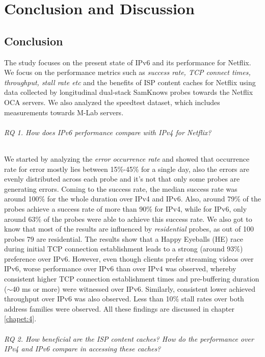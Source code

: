 \chapter{Conclusion and Discussion}\label{chapter:8}

\section*{Conclusion}
The study focuses on the present state of IPv6 and its performance for Netflix. We focus on the performance metrics such as \textit{success rate, TCP connect times, throughput, stall rate etc} and the benefits of ISP content caches
for Netflix using data collected by longitudinal dual-stack SamKnows probes towards the Netflix OCA servers. We also analyzed the speedtest dataset, which includes measurements towards M-Lab servers.

\subparagraph{RQ 1. How does IPv6 performance compare with IPv4 for Netflix?}


We started by analyzing the \textit{error occurrence rate} and showed that occurrence rate for error mostly lies between 15\%-45\% for a single day, also the errors are evenly
distributed across each probe and it’s not that only some probes are generating errors. Coming to the success rate, the median success rate was around 100\% for the whole duration over IPv4 and IPv6. Also, around 79\% of the probes
achieve a success rate of more than 90\% for IPv4, while for IPv6, only around 63\% of the probes were able to achieve this success rate. We also got to know that most of the results are influenced by \textit{residential} probes, as out of 100 probes 79 are residential.
The results show that a Happy Eyeballs (HE) race during initial TCP connection establishment leads to a strong (around 93\%) preference over IPv6. 
However, even though clients prefer streaming videos over IPv6, worse performance over IPv6 than over IPv4 was observed, whereby consistent higher TCP connection establishment times and pre-buffering duration ($\sim$40 ms or more) were witnessed over IPv6. Similarly, consistent lower achieved throughput over IPv6 was also observed. Less than 10\% stall rates over both address families were observed. All these findings are discussed in chapter \ref{chapet:4}.

\subparagraph{RQ 2. How beneficial are the ISP content caches? How do the performance over IPv4 and IPv6 compare in accessing these caches?}


